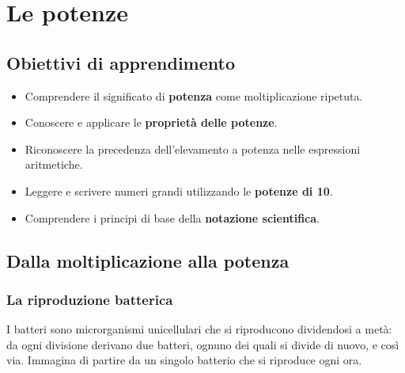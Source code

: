 
\chapter{Le potenze}

\section*{Obiettivi di apprendimento}
\begin{itemize}[leftmargin=1.5em]
  \item Comprendere il significato di \textbf{potenza} come moltiplicazione ripetuta.
  \item Conoscere e applicare le \textbf{proprietà delle potenze}.
  \item Riconoscere la precedenza dell'elevamento a potenza nelle espressioni aritmetiche.
  \item Leggere e scrivere numeri grandi utilizzando le \textbf{potenze di 10}.
  \item Comprendere i principi di base della \textbf{notazione scientifica}.
\end{itemize}

\section{Dalla moltiplicazione alla potenza}

\subsection{La riproduzione batterica}

I batteri sono microrganismi unicellulari che si riproducono dividendosi a metà:
da ogni divisione derivano due batteri, ognuno dei quali si divide di nuovo, e così via.
Immagina di partire da un singolo batterio che si riproduce ogni ora.

